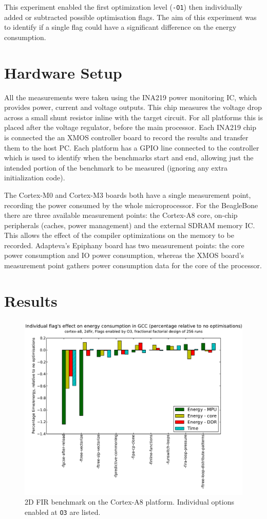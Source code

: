 \documentclass[twocolumn]{article}
\newcommand{\nsection}[1]{\section{\bfseries #1}}
\let\oldcaption\caption
\renewcommand{\caption}[1]{\oldcaption{\textup{#1}}}
\begin{document}
This experiment enabled the first optimization level (\texttt{-O1}) then individually added or subtracted possible optimisation flags. The aim of this experiment was to identify if a single flag could have a significant difference on the energy consumption.

\nsection{Hardware Setup}

All the measurements were taken using the INA219 power monitoring IC\cite{INA219}, which provides power, current and voltage outputs. This chip measures the voltage drop across a small shunt resistor inline with the target circuit. For all platforms this is placed after the voltage regulator, before the main processor. Each INA219 chip is connected the an XMOS controller board to record the results and transfer them to the host PC. Each platform has a GPIO line connected to the controller which is used to identify when the benchmarks start and end, allowing just the intended portion of the benchmark to be measured (ignoring any extra initialization code).

The Cortex-M0 and Cortex-M3 boards both have a single measurement point, recording the power consumed by the whole microprocessor. For the BeagleBone there are three available measurement points: the Cortex-A8 core, on-chip peripherals (caches, power management) and the external SDRAM memory IC. This allows the effect of the compiler optimizations on the memory to be recorded. Adapteva's Epiphany board has two measurement points: the core power consumption and IO power consumption, whereas the XMOS board's measurement point gathers power consumption data for the core of the processor.

\nsection{Results}

\begin{figure}[t]
	\includegraphics[width=\linewidth,clip,trim=0.5cm 0 2cm 1.8cm]{cortex-a8/O3_main_effects_2dfir.pdf}
	\caption{2D FIR benchmark on the Cortex-A8 platform. Individual options enabled at \texttt{O3} are listed.}
	\label{Fig:O3_2dfir_A8}
\end{figure}
\end{document}
